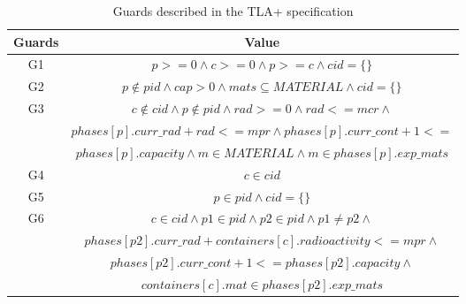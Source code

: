 \begin{table}[h]
\centering
\begin{tabular}{| c | c | }
	\cline{1-2}
	\textbf{Guards} & \textbf{Value} \\ \hline
	G1 & $p >= 0 \land c >= 0 \land p >= c \land cid = \{\}$ \\ \hline
	G2 & $p \notin pid \land cap > 0 \land mats \subseteq MATERIAL \land cid = \{\}$ \\ \hline
	G3 & $c \notin cid \land p \notin pid \land rad >= 0 \land rad <= mcr \land $ 
	\\ & $phases[p].curr\_rad + rad <= mpr \land phases[p].curr\_cont + 1 <= $ 
	\\ & $phases[p].capacity \land m \in MATERIAL \land m \in phases[p].exp\_mats$ \\ \hline
	G4 & $c \in cid$ \\ \hline
	G5 & $p \in pid \land cid = \{\}$ \\ \hline
    G6 & $c \in cid \land p1 \in pid \land p2 \in pid \land p1 \neq p2 \land$ 
    \\ & $phases[p2].curr\_rad + containers[c].radioactivity <= mpr \land$ 
    \\ & $phases[p2].curr\_cont + 1 <= phases[p2].capacity \land$ 
    \\ & $containers[c].mat \in phases[p2].exp\_mats$ \\ \hline
\end{tabular}
\caption {Guards described in the TLA+ specification}
\label{tbl:guards}
\end{table}

\newpage

